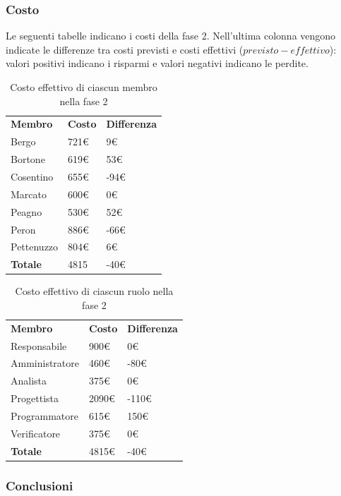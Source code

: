 	\subsubsection{Costo}
		Le seguenti tabelle indicano i costi della fase 2. Nell'ultima colonna vengono indicate le differenze tra costi previsti e costi effettivi ($previsto - effettivo$): valori positivi indicano i risparmi e valori negativi indicano le perdite.
		\begin{table}[h]
			\centering
		\begin{tabular}{| l | l | l |}
			\rowcolor{LightBlue}
			\textbf{\color{white}Membro}
			& \textbf{\color{white}Costo}
			& \textbf{\color{white}Differenza}\\
			
			Bergo		& 721€	& 9€\\
			Bortone		& 619€	& 53€\\
			Cosentino	& 655€	& -94€\\
			Marcato		& 600€	& 0€\\
			Peagno		& 530€	& 52€\\
			Peron		& 886€	& -66€\\
			Pettenuzzo	& 804€	& 6€\\ \hline
			\textbf{Totale} & 4815	& -40€\\ \hline
		\end{tabular}
		\caption{Costo effettivo di ciascun membro nella fase 2}	
	\end{table}
	\begin{table}[h]
		\centering
		\begin{tabular}{| l | l |l|}
			\rowcolor{LightBlue}
			\textbf{\color{white}Membro}
			& \textbf{\color{white}Costo}
			& \textbf{\color{white}Differenza}\\

			Responsabile	& 900€	& 0€\\
			Amministratore 	& 460€ 	& -80€\\
			Analista 		& 375€ 	& 0€\\
			Progettista 	& 2090€	& -110€\\
			Programmatore 	& 615€	& 150€\\
			Verificatore 	& 375€	& 0€\\ \hline
			\textbf{Totale} & 4815€	& -40€\\ \hline
		\end{tabular}
		\caption{Costo effettivo di ciascun ruolo nella fase 2}
	\end{table}
	\newpage
	\subsubsection{Conclusioni}
